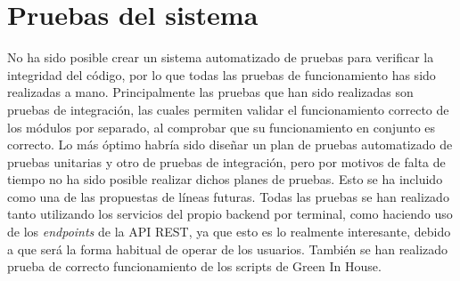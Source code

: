 \section{Pruebas del sistema}
No ha sido posible crear un sistema automatizado de pruebas para verificar la integridad del código, por lo que todas las pruebas de funcionamiento has sido realizadas a mano. Principalmente las pruebas que han sido realizadas son pruebas de integración, las cuales permiten validar el funcionamiento correcto de los módulos por separado, al comprobar que su funcionamiento en conjunto es correcto. 
Lo más óptimo habría sido diseñar un plan de pruebas automatizado de pruebas unitarias y otro de pruebas de integración, pero por motivos de falta de tiempo no ha sido posible realizar dichos planes de pruebas. Esto se ha incluido como una de las propuestas de líneas futuras.
Todas las pruebas se han realizado tanto utilizando los servicios del propio backend por terminal, como haciendo uso de los \textit{endpoints} de la API REST, ya que esto es lo realmente interesante, debido a que será la forma habitual de operar de los usuarios. También se han realizado prueba de correcto funcionamiento de los scripts de Green In House.

